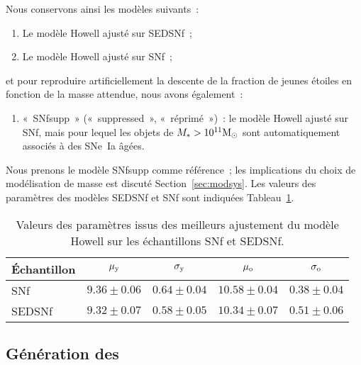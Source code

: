 \documentclass[../main/main.tex]{subfiles}
\begin{document}
Nous conservons ainsi les modèles suivants~:
\begin{enumerate}
    \item Le modèle Howell ajusté sur SEDSNf~;
    \item Le modèle Howell ajusté sur SNf~;
\end{enumerate}
et pour reproduire artificiellement la descente de la fraction de jeunes étoiles
en fonction de la masse attendue, nous avons également~:
\begin{enumerate}[resume]
    \item «~SNfsupp~» («~suppressed~», «~réprimé~»)~: le modèle Howell ajusté
        sur SNf, mais pour lequel les objets de $M_* > 10^{11}\si{\Msun}$ sont
        automatiquement associés à des SNe~Ia âgées.
\end{enumerate}

Nous prenons le modèle SNfsupp comme référence~; les implications du choix de
modélisation de masse est discuté Section~\ref{sec:modsys}. Les valeurs des
paramètres des modèles SEDSNf et SNf sont indiquées
Tableau~\ref{tab:modelresults}.

\begin{table}[ht]
    \centerfloat
    \caption[Valeurs des paramètres issus des meilleurs ajustement du modèle
    Howell sur les échantillons SNf et SEDSNf]{Valeurs des paramètres issus des
    meilleurs ajustement du modèle Howell sur les échantillons SNf et SEDSNf.}
    \label{tab:modelresults}
    \begin{tabular}{lcccc}
        \toprule
        Échantillon              &
                $\mu_{\rm y} $   &
                $\sigma_{\rm y}$ &
                $\mu_{\rm o} $   &
                $\sigma_{\rm o}$ \\
        \midrule
        SNf    & $9.36  \pm 0.06$
               & $0.64  \pm 0.04$
               & $10.58 \pm 0.04$
               & $0.38  \pm 0.04$
               \\
        SEDSNf & $9.32  \pm 0.07$
               & $0.58  \pm 0.05$
               & $10.34 \pm 0.07$
               & $0.51  \pm 0.06$
               \\
        \bottomrule
    \end{tabular}
\end{table}

\subsection{Génération des \hostlib}\label{ssec:inpgen}
\end{document}

